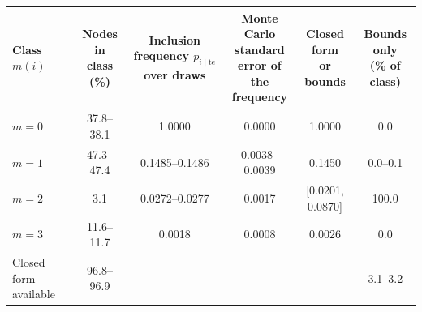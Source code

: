 \begin{tabular}{lccccc}
\toprule
Class $m(i)$ & \celula{Nodes in \\ \relax class (\%)} & \celula{Inclusion \\ \relax frequency \\ \relax $p_{i\mid\mathrm{te}}$ over \\ \relax 200 draws} & \celula{Monte Carlo \\ \relax standard \\ \relax error of \\ \relax the \\ \relax frequency} & \celula{Closed form \\ \relax or bounds} & \celula{Bounds only \\ \relax (\% of \\ \relax class)} \\
\midrule
$m=0$ & 37.8--38.1 & 1.0000 & 0.0000 & 1.0000 & 0.0 \\
$m=1$ & 47.3--47.4 & 0.1485--0.1486 & 0.0038--0.0039 & 0.1450 & 0.0--0.1 \\
$m=2$ & 3.1 & 0.0272--0.0277 & 0.0017 & [0.0201, 0.0870] & 100.0 \\
$m=3$ & 11.6--11.7 & 0.0018 & 0.0008 & 0.0026 & 0.0 \\
\midrule
Closed form available & 96.8--96.9 & & & & 3.1--3.2 \\
\bottomrule
\end{tabular}
